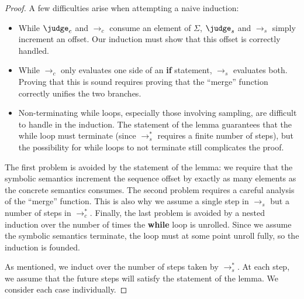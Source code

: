 \begin{proof}
  A few difficulties arise when attempting a naive induction:

  \begin{itemize}
  \item While $\judge_c$ and $\to_c$ consume an element of $\Sigma$,
    $\judge_s$ and $\to_s$ simply increment an offset. Our induction
    must show that this offset is correctly handled.
  \item While $\to_c$ only evaluates one side of an \textbf{if}
    statement, $\to_s$ evaluates both.  Proving that this is sound
    requires proving that the ``merge'' function correctly unifies the
    two branches.
  \item Non-terminating while loops, especially those involving
    sampling, are difficult to handle in the induction.  The statement
    of the lemma guarantees that the while loop must terminate (since
    $\to_s^{*}$ requires a finite number of steps), but the possibility
    for while loops to not terminate still complicates the proof.
  \end{itemize}
   
  The first problem is avoided by the statement of the lemma: we
  require that the symbolic semantics increment the sequence offset by
  exactly as many elements as the concrete semantics consumes.  The
  second problem requires a careful analysis of the ``merge''
  function.  This is also why we assume a single step in $\to_s$ but a
  number of steps in $\to_c^{*}$.  Finally, the last problem is avoided
  by a nested induction over the number of times the \textbf{while}
  loop is unrolled.  Since we assume the symbolic semantics terminate,
  the loop must at some point unroll fully, so the induction is
  founded.

  As mentioned, we induct over the number of steps taken by $\to_s^{*}$.
  At each step, we assume that the future steps will satisfy the
  statement of the lemma.  We consider each case individually.


\end{proof}
